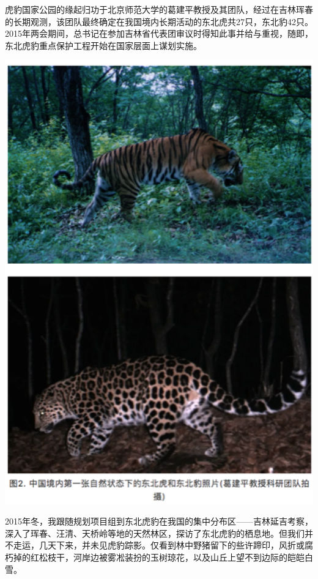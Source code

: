 \documentclass[]{book}
\begin{document}
虎豹国家公园的缘起归功于北京师范大学的葛建平教授及其团队，经过在吉林珲春的长期观测，该团队最终确定在我国境内长期活动的东北虎共27只，东北豹42只。2015年两会期间，总书记在参加吉林省代表团审议时得知此事并给与重视，随即，东北虎豹重点保护工程开始在国家层面上谋划实施。

\includegraphics[width=5.79in]{images/tiger2}

2015年冬，我跟随规划项目组到东北虎豹在我国的集中分布区------吉林延吉考察，深入了珲春、汪清、天桥岭等地的天然林区，探访了东北虎豹的栖息地。但我们并不走运，几天下来，并未见虎豹踪影。仅看到林中野猪留下的些许蹄印，风折或腐朽掉的红松枝干，河岸边被雾凇装扮的玉树琼花，以及山丘上望不到边际的皑皑白雪。
\end{document}
